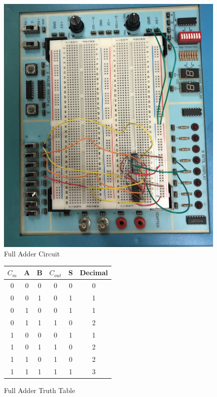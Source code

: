 \documentclass[11pt]{article}
\begin{document}
\begin{figure}
\includegraphics[width=1.0\textwidth]{"FUULADDER"}
\caption{Full Adder Circuit}
\end{figure}
\begin{figure}[ht]\centering
	\begin{tabular}{c|c|c||c|c||c}
		\toprule
		$C_{m}$ & A & B & $C_{out}$ & S & Decimal \\
		\midrule
		0 & 0 & 0 & 0 & 0 & 0  \\
		0 & 0 & 1 & 0 & 1 & 1  \\
		0 & 1 & 0 & 0 & 1 & 1  \\
		0 & 1 & 1 & 1 & 0 & 2  \\
		1 & 0 & 0 & 0 & 1 & 1  \\
		1 & 0 & 1 & 1 & 0 & 2  \\
		1 & 1 & 0 & 1 & 0 & 2  \\
		1 & 1 & 1 & 1 & 1 & 3  \\
		\bottomrule
	\end{tabular} 
	
	\caption{Full Adder Truth Table}
	
\end{figure}
\end{document}
